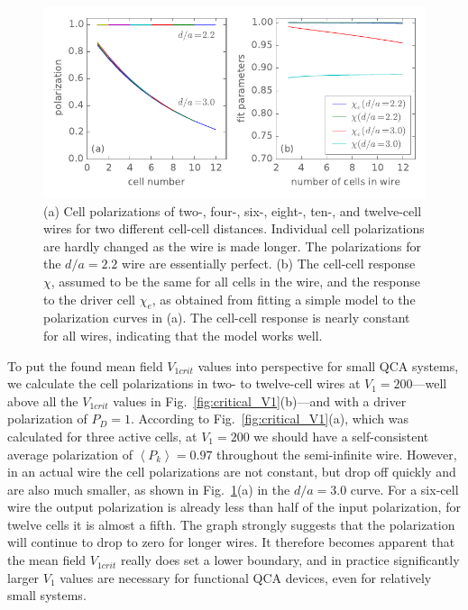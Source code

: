 \begin{figure}
  \center
  \includegraphics{wire_polarization}
  \caption{
  (a) Cell polarizations of two-, four-, six-, eight-, ten-, and twelve-cell
  wires for two different cell-cell distances. Individual cell polarizations are
  hardly changed as the wire is made longer. The polarizations for the $d/a =
  2.2$ wire are essentially perfect.
  (b) The cell-cell response $\chi$, assumed to be the same for all cells in the
  wire, and the response to the driver cell $\chi_e$, as obtained from fitting a
  simple model to the polarization curves in (a). The cell-cell response is
  nearly constant for all wires, indicating that the model works well.
  }
  \label{fig:wire_polarization}
\end{figure}

To put the found mean field $V_{1crit}$ values into perspective for small QCA
systems, we calculate the cell polarizations in two- to twelve-cell wires at
$V_1 = 200$---well above all the $V_{1crit}$ values in
Fig.~\ref{fig:critical_V1}(b)---and with a driver polarization of $P_D = 1$.
According to Fig.~\ref{fig:critical_V1}(a), which was calculated for three
active cells, at $V_1 = 200$ we should have a self-consistent average
polarization of $\left< P_k \right> = 0.97$ throughout the semi-infinite wire.
However, in an actual wire the cell polarizations are not constant, but drop off
quickly and are also much smaller, as shown in
Fig.~\ref{fig:wire_polarization}(a) in the $d/a = 3.0$ curve. For a six-cell
wire the output polarization is already less than half of the input
polarization, for twelve cells it is almost a fifth. The graph strongly suggests
that the polarization will continue to drop to zero for longer wires.  It
therefore becomes apparent that the mean field $V_{1crit}$ really does set a
lower boundary, and in practice significantly larger $V_1$ values are necessary
for functional QCA devices, even for relatively small systems.

